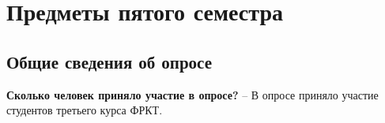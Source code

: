 \section{Предметы пятого семестра}

    \subsection{Общие сведения об опросе}

    \textbf{Сколько человек приняло участие в опросе?} -- В опросе приняло участие  студентов третьего курса ФРКТ.

    
    
    
    
    
    
    
    